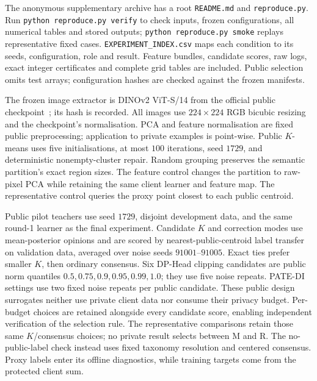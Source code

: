 The anonymous supplementary archive has a root \texttt{README.md} and
\texttt{reproduce.py}. Run \texttt{python reproduce.py verify} to check
inputs, frozen configurations, all numerical tables and stored outputs;
\texttt{python reproduce.py smoke} replays representative fixed cases.
\texttt{EXPERIMENT\_INDEX.csv} maps each condition to its seeds, configuration,
role and result. Feature bundles, candidate scores, raw logs, exact integer
certificates and complete grid tables are included. Public selection omits test
arrays; configuration hashes are checked against the frozen manifests.

The frozen image extractor is DINOv2 ViT-S/14 from the official public
checkpoint~\cite{oquab2023dinov2}; its hash is recorded. All images use
$224\times224$ RGB bicubic resizing and the checkpoint's normalisation.
PCA and feature normalisation are fixed public preprocessing; application to
private examples is point-wise. Public $K$-means uses five initialisations,
at most $100$ iterations, seed $1729$, and deterministic nonempty-cluster repair.
Random grouping preserves the semantic partition's exact region sizes.
The feature control changes the partition to raw-pixel PCA while retaining
the same client learner and feature map. The representative control queries
the proxy point closest to each public centroid.

Public pilot teachers use seed $1729$, disjoint development data, and the same
round-1 learner as the final experiment. Candidate $K$ and correction modes
use mean-posterior opinions and are scored by nearest-public-centroid label
transfer on validation data,
averaged over noise seeds $91001$--$91005$. Exact ties prefer smaller $K$,
then ordinary consensus. Six DP-Head clipping candidates are public norm
quantiles $0.5,0.75,0.9,0.95,0.99,1.0$; they use five noise repeats.
PATE-DI settings use two fixed noise repeats per public candidate.
These public design surrogates neither use private client data nor consume
their privacy budget. Per-budget choices are retained alongside every candidate
score, enabling independent verification of the selection rule.
The representative comparisons retain those same $K$/consensus choices;
no private result selects between M and R. The no-public-label check instead
uses fixed taxonomy resolution and centered consensus. Proxy labels enter its
offline diagnostics, while training targets come from the protected client sum.


